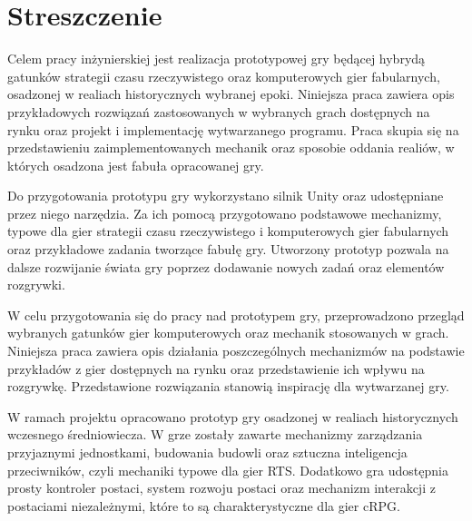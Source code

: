 \chapter*{Streszczenie}
Celem pracy inżynierskiej jest realizacja prototypowej gry będącej hybrydą gatunków strategii czasu rzeczywistego oraz
komputerowych gier fabularnych, osadzonej w realiach historycznych
wybranej epoki. Niniejsza praca zawiera opis przykładowych rozwiązań zastosowanych w wybranych grach dostępnych na rynku
oraz projekt i implementację wytwarzanego programu. Praca skupia się na przedstawieniu zaimplementowanych mechanik oraz
sposobie oddania realiów, w których osadzona jest fabuła opracowanej gry.

Do przygotowania prototypu gry wykorzystano silnik Unity oraz udostępniane przez niego narzędzia. Za ich pomocą
przygotowano podstawowe mechanizmy, typowe dla gier strategii czasu rzeczywistego i komputerowych gier fabularnych oraz przykładowe zadania tworzące
fabułę gry. Utworzony prototyp pozwala na dalsze rozwijanie świata gry poprzez dodawanie nowych zadań oraz elementów
rozgrywki.

W celu przygotowania się do pracy nad prototypem gry, przeprowadzono przegląd wybranych gatunków gier komputerowych oraz
mechanik stosowanych w grach. Niniejsza praca zawiera opis działania poszczególnych mechanizmów na podstawie przykładów
z gier dostępnych na rynku oraz przedstawienie ich wpływu na rozgrywkę. Przedstawione rozwiązania stanowią inspirację dla wytwarzanej gry.

W ramach projektu opracowano prototyp gry osadzonej w realiach historycznych wczesnego średniowiecza. W grze zostały
zawarte mechanizmy zarządzania przyjaznymi jednostkami, budowania budowli oraz sztuczna inteligencja przeciwników, czyli
mechaniki typowe dla gier RTS. Dodatkowo gra udostępnia prosty kontroler postaci, system rozwoju postaci oraz mechanizm
interakcji z postaciami niezależnymi, które to są charakterystyczne dla gier cRPG.

